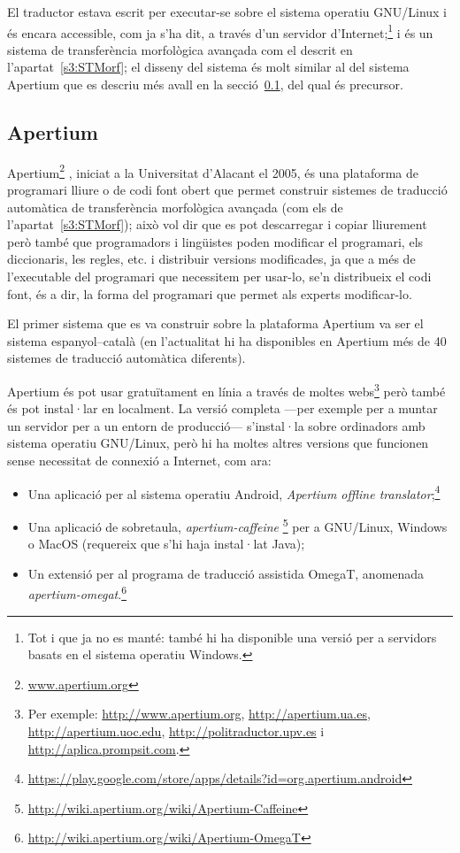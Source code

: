 El traductor estava escrit per executar-se sobre el sistema operatiu
GNU/\-Linux i és encara accessible, com ja s'ha dit, a través d'un
servidor d'Internet;\footnote{Tot i que ja no es manté: també hi ha
  disponible una versió per a servidors basats en el sistema operatiu
  Windows.} i és un sistema de transferència morfològica avançada com
el descrit en l'apartat~\ref{s3:STMorf}; el disseny del sistema és
molt similar al del sistema Apertium que es descriu més avall en la
secció~\ref{ss:apertium}, del qual és precursor.

\subsection{Apertium}
\label{ss:apertium}

Apertium\footnote{\url{www.apertium.org}} \citep{forcada2011apertium},
iniciat a la Universitat d'Alacant el 2005, és una plataforma de
programari lliure o de codi font obert que permet construir sistemes
de traducció automàtica de transferència morfològica avançada (com els
de l'apartat~\ref{s3:STMorf}); això vol dir que es pot descarregar i
copiar lliurement però també que programadors i lingüistes poden
modificar el programari, els diccionaris, les regles, etc. i
distribuir versions modificades, ja que a més de l'executable del
programari que necessitem per usar-lo, se'n distribueix el codi font,
és a dir, la forma del programari que permet als experts modificar-lo.

El primer sistema que es va construir sobre la plataforma Apertium va
ser el sistema espanyol--català (en l'actualitat hi ha disponibles en
Apertium més de 40 sistemes de traducció automàtica diferents).

Apertium és pot usar gratuïtament en línia a través de moltes
webs\footnote{Per exemple: \url{http://www.apertium.org},
  \url{http://apertium.ua.es}, \url{http://apertium.uoc.edu},
  \url{http://politraductor.upv.es} i
  \url{http://aplica.prompsit.com}.} però també és pot instal·lar en
localment. La versió completa ---per exemple per a muntar un servidor
per a un entorn de producció--- s'instal·la sobre ordinadors amb sistema
operatiu GNU/Linux, però hi ha moltes altres versions que funcionen sense necessitat de connexió a Internet, com ara:
\begin{itemize}
\item Una aplicació per al sistema operatiu Android, \emph{Apertium
    offline
    translator};\footnote{\url{https://play.google.com/store/apps/details?id=org.apertium.android}}
\item Una aplicació de sobretaula, \emph{apertium-caffeine}
  \footnote{\url{http://wiki.apertium.org/wiki/Apertium-Caffeine}} per
  a GNU/Linux, Windows o MacOS (requereix que s'hi haja instal·lat
  Java);
\item Un extensió per al programa de traducció assistida OmegaT, anomenada \emph{apertium-omegat}.\footnote{\url{http://wiki.apertium.org/wiki/Apertium-OmegaT}}
\end{itemize}




